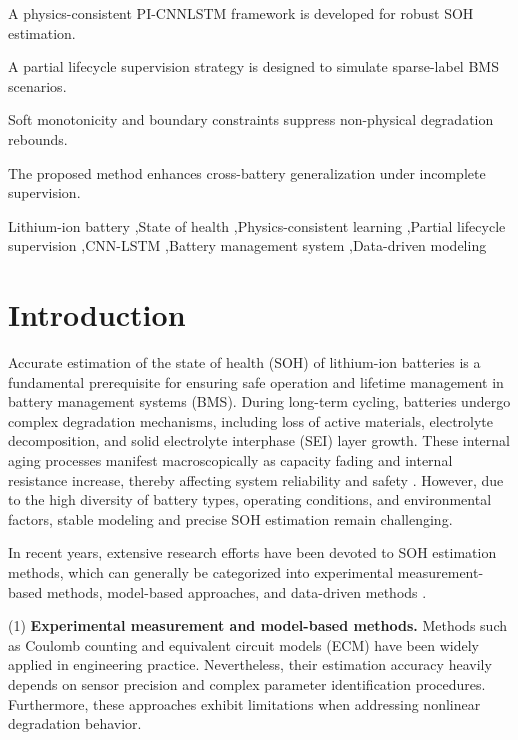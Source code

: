 \documentclass[a4paper,fleqn]{cas-dc}
\begin{document}
\begin{highlights}
\item A physics-consistent PI-CNNLSTM framework is developed for robust SOH estimation.
\item A partial lifecycle supervision strategy is designed to simulate sparse-label BMS scenarios.
\item Soft monotonicity and boundary constraints suppress non-physical degradation rebounds.
\item The proposed method enhances cross-battery generalization under incomplete supervision.
\end{highlights}

\begin{keywords}
Lithium-ion battery \sep State of health \sep Physics-consistent learning \sep Partial lifecycle supervision \sep CNN-LSTM \sep Battery management system \sep Data-driven modeling
\end{keywords}

\maketitle

\section{Introduction}
\label{sec:intro}

Accurate estimation of the state of health (SOH) of lithium-ion batteries is a fundamental prerequisite for ensuring safe operation and lifetime management in battery management systems (BMS). During long-term cycling, batteries undergo complex degradation mechanisms, including loss of active materials, electrolyte decomposition, and solid electrolyte interphase (SEI) layer growth. These internal aging processes manifest macroscopically as capacity fading and internal resistance increase, thereby affecting system reliability and safety \citep{Tao2024}. However, due to the high diversity of battery types, operating conditions, and environmental factors, stable modeling and precise SOH estimation remain challenging.

In recent years, extensive research efforts have been devoted to SOH estimation methods, which can generally be categorized into experimental measurement-based methods, model-based approaches, and data-driven methods \citep{Vignesh2024}.

(1) \textbf{Experimental measurement and model-based methods.}  
Methods such as Coulomb counting and equivalent circuit models (ECM) have been widely applied in engineering practice. Nevertheless, their estimation accuracy heavily depends on sensor precision and complex parameter identification procedures. Furthermore, these approaches exhibit limitations when addressing nonlinear degradation behavior.
\end{document}
